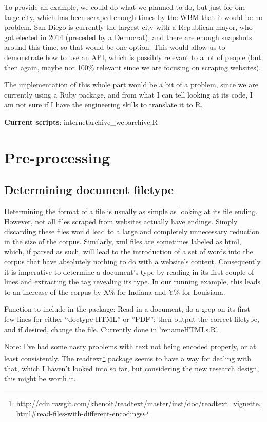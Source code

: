 \documentclass[11pt]{article}
\begin{document}
To provide an example, we could do what we planned to do, but just for one large city, which has been scraped enough times by the WBM that it would be no problem. San Diego is currently the largest city with a Republican mayor, who got elected in 2014 (preceded by a Democrat), and there are enough snapshots around this time, so that would be one option. This would allow us to demonstrate how to use an API, which is possibly relevant to a lot of people (but then again, maybe not 100\% relevant since we are focusing on scraping websites).

The implementation of this whole part would be a bit of a problem, since we are currently using a Ruby package, and from what I can tell looking at its code, I am not sure if I have the engineering skills to translate it to R.

\textbf{Current scripts}: internetarchive\_webarchive.R

\section{Pre-processing}
\subsection{Determining document filetype}
Determining the format of a file is usually as simple as looking at its file ending. However, not all files scraped from websites actually have endings. Simply discarding these files would lead to a large and completely unnecessary reduction in the size of the corpus. Similarly, xml files are sometimes labeled as html, which, if parsed as such, will lead to the introduction of a set of words into the corpus that have absolutely nothing to do with a website's content. Consequently it is imperative to determine a document's type by reading in its first couple of lines and extracting the tag revealing its type. In our running example, this leads to an increase of the corpus by X\% for Indiana and Y\% for Louisiana.

Function to include in the package: Read in a document, do a grep on its first few lines for either ``doctype HTML'' or ''PDF''; then output the correct filetype, and if desired, change the file. Currently done in 'renameHTMLs.R'.

Note: I've had some nasty problems with text not being encoded properly, or at least consistently. The readtext\footnote{\url{http://cdn.rawgit.com/kbenoit/readtext/master/inst/doc/readtext_vignette.html\#read-files-with-different-encodings}} package seems to have a way for dealing with that, which I haven't looked into so far, but considering the new research design, this might be worth it.
\end{document}
